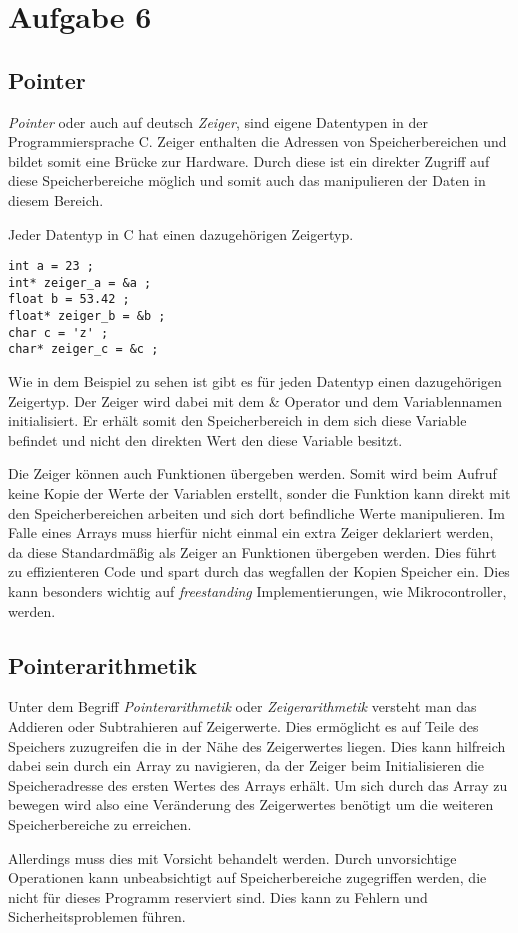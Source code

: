 \chapter{Aufgabe 6}
\section{Pointer}
\textit{Pointer} oder auch auf deutsch \textit{Zeiger}, sind eigene Datentypen in der Programmiersprache C.
Zeiger enthalten die Adressen von Speicherbereichen und bildet somit eine Brücke zur Hardware.
Durch diese ist ein direkter Zugriff auf diese Speicherbereiche möglich und somit auch das manipulieren der Daten in diesem Bereich.\par
Jeder Datentyp in C hat einen dazugehörigen Zeigertyp\cite{boekelmann:2023}.\par

\begin{lstlisting}
int a = 23 ;
int* zeiger_a = &a ;
float b = 53.42 ;
float* zeiger_b = &b ;
char c = 'z' ;
char* zeiger_c = &c ;
\end{lstlisting}

Wie in dem Beispiel zu sehen ist gibt es für jeden Datentyp einen dazugehörigen Zeigertyp.
Der Zeiger wird dabei mit dem \& Operator und dem Variablennamen initialisiert.
Er erhält somit den Speicherbereich in dem sich diese Variable befindet und nicht den direkten Wert den diese Variable besitzt.\par
Die Zeiger können auch Funktionen übergeben werden.
Somit wird beim Aufruf keine Kopie der Werte der Variablen erstellt, sonder die Funktion kann direkt mit den Speicherbereichen arbeiten und sich dort befindliche Werte manipulieren.
Im Falle eines Arrays muss hierfür nicht einmal ein extra Zeiger deklariert werden, da diese Standardmäßig als Zeiger an Funktionen übergeben werden.
Dies führt zu effizienteren Code und spart durch das wegfallen der Kopien Speicher ein.
Dies kann besonders wichtig auf \textit{freestanding} Implementierungen, wie Mikrocontroller, werden.\cite{boekelmann:2023}\par

\section{Pointerarithmetik}
Unter dem Begriff \textit{Pointerarithmetik} oder \textit{Zeigerarithmetik} versteht man das Addieren oder Subtrahieren auf Zeigerwerte.
Dies ermöglicht es auf Teile des Speichers zuzugreifen die in der Nähe des Zeigerwertes liegen.
Dies kann hilfreich dabei sein durch ein Array zu navigieren, da der Zeiger beim Initialisieren die Speicheradresse des ersten Wertes des Arrays erhält.
Um sich durch das Array zu bewegen wird also eine Veränderung des Zeigerwertes benötigt um die weiteren Speicherbereiche zu erreichen.\par
Allerdings muss dies mit Vorsicht behandelt werden.
Durch unvorsichtige Operationen kann unbeabsichtigt auf Speicherbereiche zugegriffen werden, die nicht für dieses Programm reserviert sind.
Dies kann zu Fehlern und Sicherheitsproblemen führen\cite{boekelmann:2023}.\par

